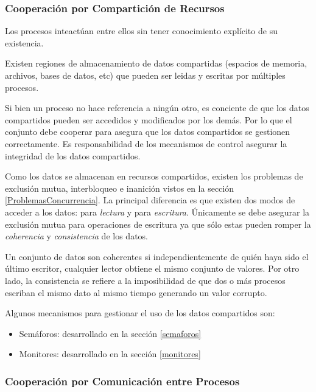 \subsubsection{Cooperación por Compartición de Recursos}

Los procesos inteactúan entre ellos sin tener conocimiento explícito de su
existencia.

Existen regiones de almacenamiento de datos compartidas (espacios de memoria,
archivos, bases de datos, etc) que pueden ser leidas y escritas por múltiples
procesos.

Si bien un proceso no hace referencia a ningún otro, es conciente de que los
datos compartidos pueden ser accedidos y modificados por los demás. Por lo que
el conjunto debe cooperar para asegura que los datos compartidos se gestionen
correctamente. Es responsabilidad de los mecanismos de control asegurar la
integridad de los datos compartidos. \cite{SistOpStallings}

Como los datos se almacenan en recursos compartidos, existen los problemas de
exclusión mutua, interbloqueo e inanición vistos en la sección
\ref{ProblemasConcurrencia}. La principal diferencia es que existen dos modos de
acceder a los datos: para \textit{lectura} y para \textit{escritura}. Únicamente
se debe asegurar la exclusión mutua para operaciones de escritura ya que sólo
estas pueden romper la \textit{coherencia} y \textit{consistencia} de los datos.


{\color{red}{REVISAR ESTO: (coherencia vs consistencia?)}}

Un conjunto de datos son coherentes si independientemente de quién haya sido el
último escritor, cualquier lector obtiene el mismo conjunto de valores.
Por otro lado, la consistencia se refiere a la imposibilidad de que dos o más
procesos escriban el mismo dato al mismo tiempo generando un valor corrupto.

Algunos mecanismos para gestionar el uso de los datos compartidos son:
\begin{itemize}
    \item Semáforos: desarrollado en la sección \ref{semaforos}
    \item Monitores: desarrollado en la sección \ref{monitores}
\end{itemize}

\subsubsection{Cooperación por Comunicación entre Procesos}

